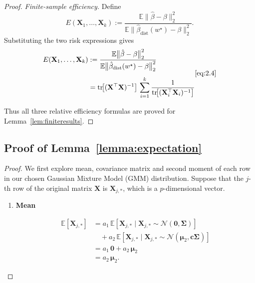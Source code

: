 \documentclass[11pt]{article}
\numberwithin{equation}{section}
\theoremstyle{plain}
\theoremstyle{definition}
\theoremstyle{remark}
\begin{document}
\begin{appendix}
\begin{proof}
      \medskip
      \textit{Finite-sample efficiency.}
      Define
      \[
        E(\mathbf{X}_{1},\dots,\mathbf{X}_{k})
         :=\frac{\mathbb E\bigl\|\hat\beta-\beta\bigr\|_{2}^{2}}
             {\mathbb E\bigl\|\hat\beta_{\mathrm{dist}}(w^{\star})-\beta\bigr\|_{2}^{2}} .
      \]
      Substituting the two risk expressions gives
      \[
      \begin{aligned}
        E(\mathbf{X}_{1},\dots,\mathbf{X}_{k})
         &:=\frac{\mathbb E\bigl\|\hat\beta-\beta\bigr\|_{2}^{2}}
             {\mathbb E\bigl\|\hat\beta_{\mathrm{dist}}(w^{\star})-\beta\bigr\|_{2}^{2}}
             \\[4pt]
         &=\operatorname{tr}\!\bigl[(\mathbf{X}^{\top}\mathbf{X})^{-1}\bigr]\,
           \sum_{i=1}^{k}
           \frac{1}{\operatorname{tr}\!\bigl[(\mathbf{X}_i^{\top}\mathbf{X}_i)^{-1}\bigr]}
      \end{aligned}
      \ref{eq:2.4}
      \]

      Thus all three relative efficiency formulas are proved for Lemma~\ref{lem:finiteresults}.

      \end{proof}

      \subsection{Proof of Lemma~\ref{lemma:expectation}}
      \begin{proof}
      We first explore mean, covariance matrix and second moment of each row in our chosen Gaussian Mixture Model (GMM) distribution.
      Suppose that the $j$-th row of the original matrix $\mathbf{X}$ is $\mathbf{X}_{j,\ast}$, which is a $p$-dimensional vector.

      \begin{enumerate}
         \item \textbf{Mean}

        \begin{align*}
         \mathbb E[\mathbf{X}_{j,\ast}]
         &= a_{1}\,\mathbb E[\mathbf{X}_{j,\ast}\mid\mathbf{X}_{j,\ast}\sim\mathcal N(\boldsymbol 0,\mathbf{\Sigma})] \\
         &\quad + a_{2}\,\mathbb E[\mathbf{X}_{j,\ast}\mid\mathbf{X}_{j,\ast}\sim\mathcal N(\boldsymbol\mu_{2},\boldsymbol c\mathbf{\Sigma})] \\[2pt]
         &= a_{1}\,\boldsymbol 0 + a_{2}\,\boldsymbol\mu_{2} \\[2pt]
         &= a_{2}\,\boldsymbol\mu_{2}.
        \end{align*}


\end{enumerate}
\end{proof}
\end{appendix}
\end{document}
